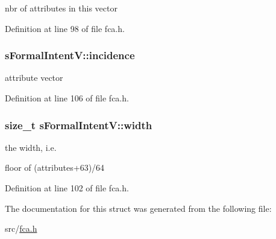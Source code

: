 nbr of attributes in this vector 



\-Definition at line 98 of file fca.\-h.

\hypertarget{structsFormalIntentV_af2b03b37318f9292907b0f09c599cc30}{
\subsubsection[{incidence}]{ {\bf s\-Formal\-Intent\-V\-::incidence}}}\label{structsFormalIntentV_af2b03b37318f9292907b0f09c599cc30}


attribute vector 



\-Definition at line 106 of file fca.\-h.

\hypertarget{structsFormalIntentV_a70711ba6edc09660adb6a838ef8d1555}{
\subsubsection[{width}]{\setlength{\rightskip}{0pt plus 5cm}size\-\_\-t {\bf s\-Formal\-Intent\-V\-::width}}}\label{structsFormalIntentV_a70711ba6edc09660adb6a838ef8d1555}


the width, i.\-e. 

floor of (attributes+63)/64 

\-Definition at line 102 of file fca.\-h.



\-The documentation for this struct was generated from the following file\-:\begin{DoxyCompactItemize}
\item 
src/\hyperlink{fca_8h}{fca.\-h}\end{DoxyCompactItemize}
